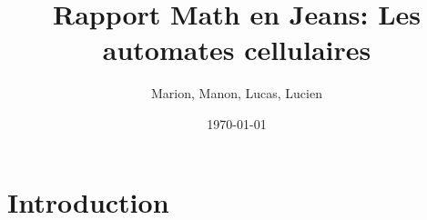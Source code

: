 \documentclass{article}
\title{Rapport Math en Jeans: Les automates cellulaires}
\author{Marion, Manon, Lucas, Lucien}
\date{\today}
\begin{document}
\maketitle

\section{Introduction}
\end{document}
